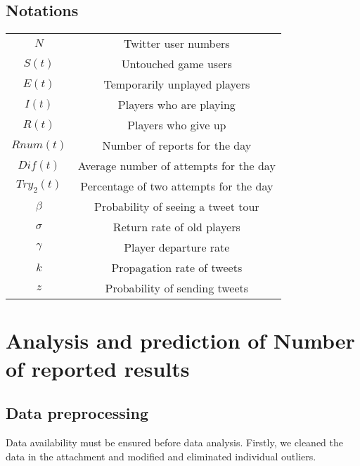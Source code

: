 \documentclass{mcmthesis}
\begin{document}
\subsection{Notations}
\begin{table}[H]
	\centering
	\renewcommand\arraystretch{1.1}
	\begin{tabular}{cc}
		\toprule[1.5pt]
		\makebox[0.3\textwidth][c]{Symbol}	&  \makebox[0.4\textwidth][c]{Description} \\
		\midrule[1pt]
		$ N $	    	& Twitter user numbers   \\ 
		$ S(t) $	    	& Untouched game users\\  
		$ E(t) $	    	& Temporarily unplayed players  \\ 
		$ I(t) $	        & Players who are playing\\ 
		$ R(t) $		& Players who give up \\ 
		$ Rnum(t) $		& Number of reports for the day \\ 
		$ Dif(t) $			& Average number of attempts for the day \\ 
		$ Try_2(t) $	    	& Percentage of two attempts for the day\\  
		$ \beta  $	    	& Probability of seeing a tweet tour  \\ 
		$ \sigma $	        & Return rate of old players\\ 
		$ \gamma $		& Player departure rate \\ 
		$ k $		& Propagation rate of tweets \\ 
		$ z $			& Probability of sending tweets \\ 
		\bottomrule[1.5pt]
	\end{tabular}
\end{table}

\section{Analysis and prediction of Number of reported results}
\subsection{Data preprocessing}

Data availability must be ensured before data analysis. Firstly, we cleaned the data in the attachment and modified and eliminated individual outliers.
\end{document}
